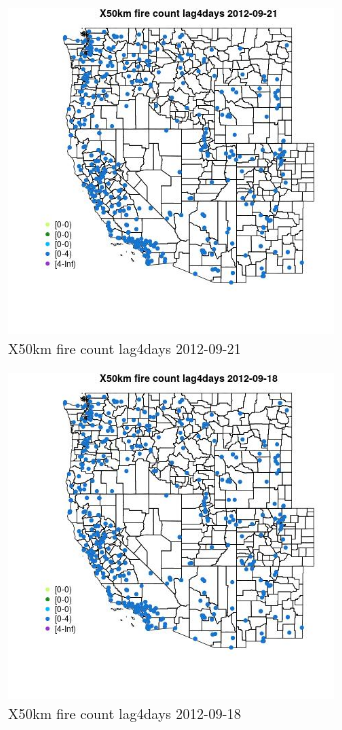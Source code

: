 \begin{figure} 
\centering  
\includegraphics[width=0.77\textwidth]{Code_Outputs/Report_ML_input_PM25_Step4_part_e_de_duplicated_aves_compiled_2019-05-14wNAs_MapObsX50km_fire_count_lag4days2012-09-21.jpg} 
\caption{\label{fig:Report_ML_input_PM25_Step4_part_e_de_duplicated_aves_compiled_2019-05-14wNAsMapObsX50km_fire_count_lag4days2012-09-21}X50km fire count lag4days 2012-09-21} 
\end{figure} 
 

\begin{figure} 
\centering  
\includegraphics[width=0.77\textwidth]{Code_Outputs/Report_ML_input_PM25_Step4_part_e_de_duplicated_aves_compiled_2019-05-14wNAs_MapObsX50km_fire_count_lag4days2012-09-18.jpg} 
\caption{\label{fig:Report_ML_input_PM25_Step4_part_e_de_duplicated_aves_compiled_2019-05-14wNAsMapObsX50km_fire_count_lag4days2012-09-18}X50km fire count lag4days 2012-09-18} 
\end{figure} 
 

